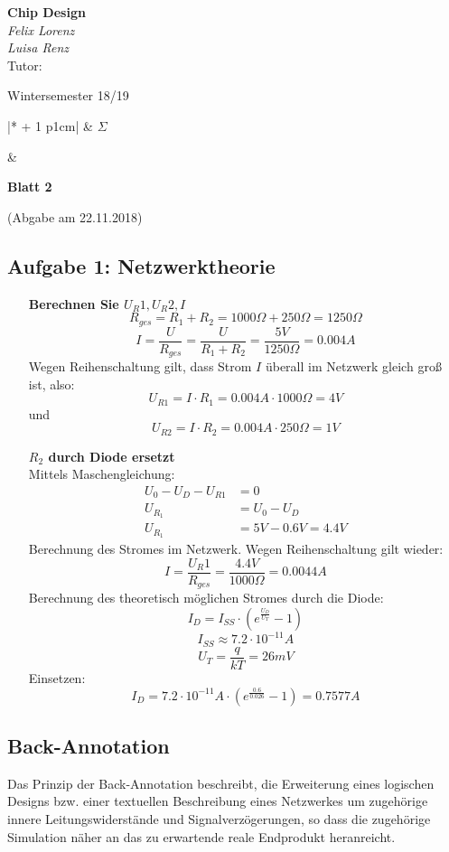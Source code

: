 \documentclass[a4paper,10pt,headsepline, DIV11]{scrartcl}%
\newcounter{aufgabe}
\def\tand{&}
\newcommand{\makeTableLine}[2][0]{%
	\setcounter{aufgabe}{1}%
	\whiledo{\value{aufgabe} < #1}%
	{%
		#2\tand\stepcounter{aufgabe}%
	}
}
\newcommand{\aufgTable}[1]{
	\def\spalten{\numexpr #1 + 1 \relax}
	\begin{tabular}{|*{\spalten}{p{1cm}|}}
		\makeTableLine[\spalten]{\theaufgabe}$\Sigma$~~\\ \hline
		\rule{0pt}{15pt}\makeTableLine[\spalten]{}\\
	\end{tabular}
}
\def\header#1#2#3#4#5#6#7#8{\pagestyle{empty}
	\begin{minipage}[t]{0.47\textwidth}
		\begin{flushleft}
			{\textbf{#4}}\\
			#5\\
			Tutor: #2\\
			#8
		\end{flushleft}
	\end{minipage}
	\begin{minipage}[t]{0.5\textwidth}
		\begin{flushright}
			#6 \vspace{0.5cm}\\
			\aufgTable{#7}
		\end{flushright}
	\end{minipage}
	\vspace{1cm}
	\begin{center}
		{\Large \textbf{Blatt #1}}
		
		{(Abgabe am #3)}
	\end{center}
}
\begin{document}
	\header{2}{}{22.11.2018}{Chip Design}{\textit{Felix Lorenz}\\ \textit{Luisa Renz}}{Wintersemester 18/19}{2}{}
	\vspace{1cm}
	\subsection*{Aufgabe 1: Netzwerktheorie}
	\begin{itemize}
		\item[\textbf{Berechnen Sie $U_R1, U_R2, I$}]\hfill \\
		\[ R_{ges} = R_1 + R_2 = 1000\Omega + 250\Omega = 1250\Omega \]
		\[I = \frac{U}{R_{ges}} = \frac{U}{R_1 + R_2} = \frac{5V}{1250\Omega} = 0.004 A \]
		Wegen Reihenschaltung gilt, dass Strom $I$ überall im Netzwerk gleich groß ist, also:
		\[ U_{R1} = I \cdot R_1 = 0.004 A \cdot 1000\Omega = 4 V \]
		und
		\[ U_{R2} = I \cdot R_2 = 0.004 A \cdot 250\Omega = 1 V \]
		
		\item[\textbf{$R_2$ durch Diode ersetzt}]\hfill \\
		Mittels Maschengleichung:
		\begin{align*}
			U_0 - U_D - U_{R1} &= 0\\
			U_{R_1} &= U_0 - U_D\\
			U_{R_1} &= 5 V - 0.6 V = 4.4 V
		\end{align*}
		Berechnung des Stromes im Netzwerk. Wegen Reihenschaltung gilt wieder:
		\[I = \frac{U_R1}{R_{ges}} = \frac{4.4V}{1000\Omega} = 0.0044 A \]
		Berechnung des theoretisch möglichen Stromes durch die Diode:
		\[ I_D = I_{SS} \cdot (e^{\frac{U_D}{U_T}}-1) \]
		\[I_{SS} \approx 7.2 \cdot 10^{-11}A \]
		\[U_T = \frac{q}{kT} = 26mV\]
		Einsetzen:
		\[ I_D = 7.2 \cdot 10^{-11}A \cdot (e^{\frac{0.6}{0.026}}-1) = 0.7577 A  \]
		
	\end{itemize}

\subsection*{Back-Annotation}
Das Prinzip der Back-Annotation beschreibt, die Erweiterung eines logischen Designs bzw. einer textuellen Beschreibung eines Netzwerkes um zugehörige innere Leitungswiderstände und Signalverzögerungen, so dass die zugehörige Simulation näher an das zu erwartende reale Endprodukt heranreicht.
	
\end{document}
